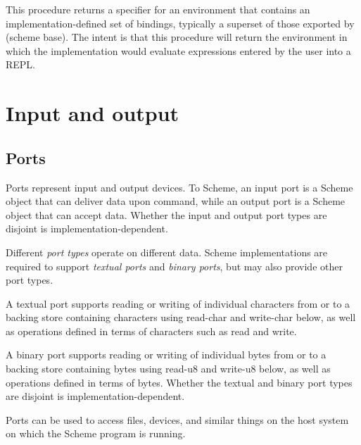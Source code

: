 \begin{entry}{%
}

This procedure returns a specifier for an environment that contains an
imple\-men\-ta\-tion-defined set of bindings, typically a superset of
those exported by {\cf(scheme base)}.  The intent is that this procedure
will return the environment in which the implementation would evaluate
expressions entered by the user into a REPL.

\end{entry}

\section{Input and output}

\subsection{Ports}
\label{portsection}

Ports represent input and output devices.  To Scheme, an input port is
a Scheme object that can deliver data upon command, while an output
port is a Scheme object that can accept data.
Whether the input and output port types are disjoint is
implementation-dependent.

Different {\em port types} operate on different data.  Scheme
imple\-men\-ta\-tions are required to support {\em textual ports}
and {\em binary ports}, but may also provide other port types.

A textual port supports reading or writing of individual characters
from or to a backing store containing characters
using {\cf read-char} and {\cf write-char} below, as well as operations
defined in terms of characters such as {\cf read} and {\cf write}.

A binary port supports reading or writing of individual bytes from
or to a backing store containing bytes using {\cf read-u8} and {\cf
write-u8} below, as well as operations defined in terms of bytes.
Whether the textual and binary port types are disjoint is
implementation-dependent.

Ports can be used to access files, devices, and similar things on the host
system on which the Scheme program is running.

